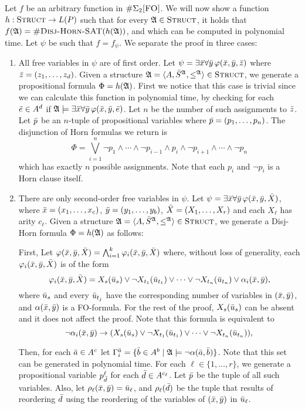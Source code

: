 Let $f$ be an arbitrary function in $\#\Sigma_{2}\textsc{[FO]}$. We will now show a function $h:\text{\sc Struct}\to L(P)$ such that for every $\mathfrak{A}\in\text{\sc Struct}$, it holds that $f(\mathfrak{A}) = \textsc{\#Disj-Horn-SAT}(h(\mathfrak{A}))$, and which can be computed in polynomial time. Let $\psi$ be such that $f = f_{\psi}$. We separate the proof in three cases:\begin{enumerate}
	\item All free variables in $\psi$ are of first order. Let $\psi = \exists \bar{x} \forall \bar{y}\,\varphi(\bar{x},\bar{y},\bar{z})$ where $\bar{z} = (z_1,\ldots,z_d)$. Given a structure $\mathfrak{A} = \langle A, \bar{S}^{\mathfrak{A}}, \leq^{\mathfrak{A}} \rangle\in\text{\sc Struct}$, we generate a propositional formula $\Phi = h(\mathfrak{A})$. First we notice that this case is trivial since we can calculate this function in polynomial time, by checking for each $\bar{e}\in A^d$ if $\mathfrak{A}\models\exists\bar{x}\forall \bar{y}\,\varphi(\bar{x},\bar{y},\bar{e})$. Let $n$ be the number of such assignments to $\bar{z}$. Let $\bar{p}$ be an $n$-tuple of propositional variables where $\bar{p} = (p_1,\ldots,p_n)$. The disjunction of Horn formulas we return is
	\[
	\Phi = \bigvee_{i = 1}^n \neg p_1 \wedge \cdots \wedge \neg p_{i-1} \wedge p_i \wedge \neg p_{i+1} \wedge \cdots \wedge \neg p_n
	\]
	which has exactly $n$ possible assignments. Note that each $p_i$ and $\neg p_i$ is a Horn clause itself.
	
	\item There are only second-order free variables in $\psi$. Let $\psi = \exists \bar{x}\forall \bar{y}\,\varphi(\bar{x},\bar{y},\bar{X})$, where $\bar{x} = (x_1,\ldots,x_c)$, $\bar{y} = (y_1,\ldots,y_b)$, $\bar{X} = (X_1,\ldots,X_r)$ and each $X_{\ell}$ has arity $c_{\ell}$. Given a structure $\mathfrak{A} = \langle A, \bar{S}^{\mathfrak{A}}, \leq^{\mathfrak{A}} \rangle\in\text{\sc Struct}$, we generate a Disj-Horn formula $\Phi = h(\mathfrak{A})$ as follows:
	
	First, Let $\varphi(\bar{x},\bar{y},\bar{X}) = \bigwedge_{i = 1}^k \varphi_{i}(\bar{x},\bar{y},\bar{X})$ where, without loss of generality, each $\varphi_{i}(\bar{x},\bar{y},\bar{X})$ is of the form
	\[
	\varphi_{i}(\bar{x},\bar{y},\bar{X}) = X_s(\bar{u}_{s}) \vee \neg X_{t_1}(\bar{u}_{t_1}) \vee \cdots \vee \neg X_{t_n}(\bar{u}_{t_n}) \vee \alpha_i(\bar{x},\bar{y}),
	\]
	where $\bar{u}_{s}$ and every $\bar{u}_{t_j}$ have the corresponding number of variables in $(\bar{x},\bar{y})$, and $\alpha(\bar{x},\bar{y})$ is a FO-formula. For the rest of the proof, $X_s(\bar{u}_s)$ can be absent and it does not affect the proof. Note that this formula is equivalent to
	\[
	\neg\alpha_i(\bar{x},\bar{y}) \to (X_s(\bar{u}_{s}) \vee \neg X_{t_1}(\bar{u}_{t_1}) \vee \cdots \vee \neg X_{t_n}(\bar{u}_{t_n})),
	\]
	
	Then, for each $\bar{a}\in A^c$ let $\Gamma_i^{\bar{a}} = \{\bar{b}\in A^{b}\mid \mathfrak{A}\models\neg\alpha(\bar{a},\bar{b})\}$. Note that this set can be generated in polynomial time. For each $\ell\in\{1,\ldots,r\}$, we generate a propositional variable $p^{\ell}_{\bar{d}}$ for each $\bar{d}\in A^{c_{\ell}}$. Let $\bar{p}$ be the tuple of all such variables. Also, let $\rho_{\ell}(\bar{x},\bar{y}) = \bar{u}_{\ell}$, and $\rho_{\ell}(\bar{d})$ be the tuple that results of reordering $\bar{d}$ using the reordering of the variables of $(\bar{x},\bar{y})$ in $\bar{u}_{\ell}$.
	

\end{enumerate}
